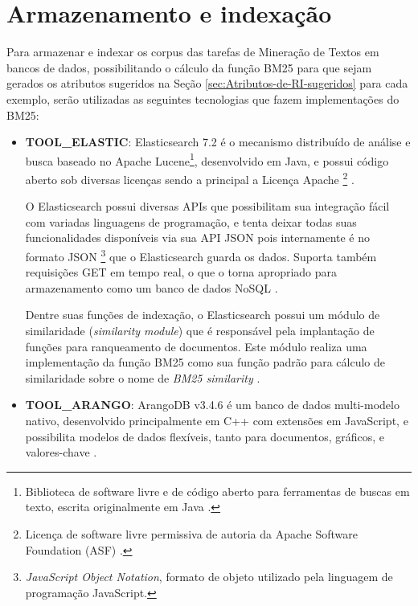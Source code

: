     
\section{Armazenamento e indexação} \label{sec:Armazenamento-e-indexação}

    Para armazenar e indexar os corpus das tarefas de Mineração de Textos em bancos de dados, possibilitando o cálculo da função BM25 para que sejam gerados os atributos sugeridos na Seção \ref{sec:Atributos-de-RI-sugeridos} para cada exemplo, serão utilizadas as seguintes tecnologias que fazem implementações do BM25:
    \begin{itemize}
        \item \textbf{TOOL\_ELASTIC}: Elasticsearch 7.2 é o mecanismo distribuído de análise e busca baseado no Apache Lucene\footnote{Biblioteca de software livre e de código aberto para ferramentas de buscas em texto, escrita originalmente em Java \cite{LUCENE_DOCUMENTATION_2019}.}, desenvolvido em Java, e possui código aberto sob diversas licenças sendo a principal a Licença Apache
        \footnote{Licença de software livre permissiva de autoria da Apache Software Foundation (ASF) \cite{NEWMEDIA_OPENGUIDE_2015}.}
         \cite{ELASTIC_REFERENCE_INTRO_2019}. 
        
        O Elasticsearch possui diversas APIs que possibilitam sua integração fácil com variadas linguagens de programação, e tenta deixar todas suas funcionalidades disponíveis via sua API JSON pois internamente é no formato JSON
        \footnote{\textit{JavaScript Object Notation}, formato de objeto utilizado pela linguagem de programação JavaScript.}
         que o Elasticsearch guarda os dados. 
        Suporta também requisições GET em tempo real, o que o torna apropriado para armazenamento como um banco de dados NoSQL \cite{PETER_ELASTICDB_2011, VOLKAN_ELASTIC_DATASTORE_2018}.
        
        Dentre suas funções de indexação, o Elasticsearch possui um módulo de similaridade (\textit{similarity module}) que é responsável pela implantação de funções para ranqueamento de documentos.
        Este módulo realiza uma implementação da função BM25 como sua função padrão para cálculo de similaridade sobre o nome de \textit{BM25 similarity} \cite{ELASTIC_REFERENCE_SIMILARITY_2019}.
        
        \item \textbf{TOOL\_ARANGO}: ArangoDB v3.4.6 é um banco de dados multi-modelo nativo, desenvolvido principalmente em C++ com extensões em JavaScript, e possibilita modelos de dados flexíveis, tanto para documentos, gráficos, e valores-chave \cite{ARANGODB_DOC_2019}.
        

\end{itemize}

